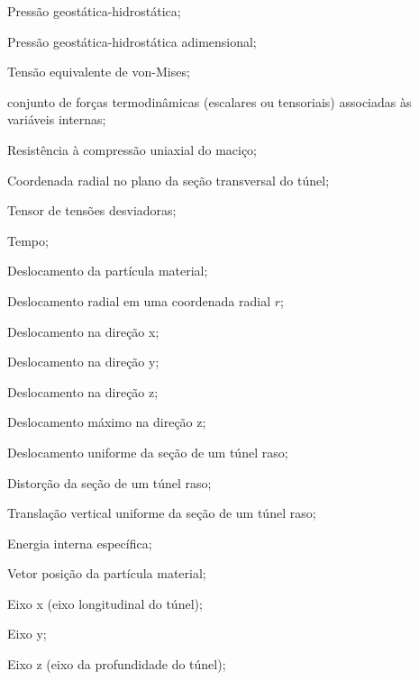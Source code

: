 \item[$ p_\infty $]		Pressão geostática-hidrostática;
\item[$ p_\infty^* $]	Pressão geostática-hidrostática adimensional;
\item[$ q $]	Tensão equivalente de von-Mises;
\item[$\ql$] conjunto de forças termodinâmicas (escalares ou tensoriais) associadas às variáveis internas;
\item[$ q_0 $] 			Resistência à compressão uniaxial do maciço;
\item[$ r $]			Coordenada radial no plano da seção transversal do túnel;
\item[$ \sll $]			Tensor de tensões desviadoras;
\item[$ t $] 			Tempo;
\item[$ \ul $] 		    Deslocamento da partícula material;
\item[$ u(r) $] 		Deslocamento radial em uma coordenada radial $r$;
\item[$ u_x $] 			Deslocamento na direção x;
\item[$ u_y $] 			Deslocamento na direção y;
\item[$ u_z $] 			Deslocamento na direção z;
\item[$ u_{z_{max}} $] 	Deslocamento máximo na direção z;
\item[$ u_\varepsilon $] Deslocamento uniforme da seção de um túnel raso;
\item[$ u_\delta $] 	 Distorção da seção de um túnel raso;
\item[$ \Delta u_y $] 	 Translação vertical uniforme da seção de um túnel raso;
\item[$ w $] 	 		Energia interna específica;
\item[$\xl$]			Vetor posição da partícula material;
\item[$x$]				Eixo x (eixo longitudinal do túnel);
\item[$y$]				Eixo y;
\item[$z$]				Eixo z (eixo da profundidade do túnel);

